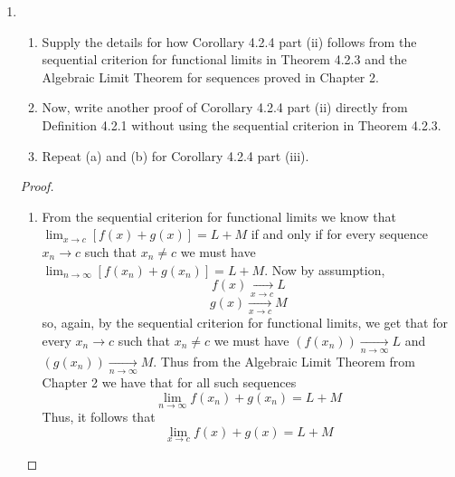 \begin{enumerate}
\begin{proof}
\begin{enumerate}
        So, we wish to show that \( \forall \epsilon > 0 \), \( \exists \delta > 0 \) such that \( x \neq 1 \) and \( x \in V_{\delta}(1) \) implies that
        \( t(x) \in V_{\epsilon}(0) \). If \( \epsilon \geq 1 \) then we are done since \(\forall_{x} t(x) \leq 1 \). Otherwise we have that \( 1 \in S \) and, by our previous argument, it follows that \( 1 \) is a isolated point of \( S \). Thus there exists \( \delta > 0 \) such that \( V_{\delta}(1) \cap S = \{ 1 \} \). Thus, for the same \( \delta \) we have that \( x \neq 1 \) and \( x \in V_{\delta}(1) \) implies that \( x \not\in S \) which, in turn, implies that \( t(x) < \epsilon \) which is equivalent to \( t(x) \in V_{\epsilon}(0) \). Thus, by Definition 4.2.1B, we get that \( \lim_{x \rightarrow 1} t(x) = 0 \). 
    \end{enumerate}
    \end{proof}
    
    \item \begin{enumerate}
        \item Supply the details for how Corollary 4.2.4 part (ii) follows from the sequential criterion for functional limits in Theorem 4.2.3 and the Algebraic Limit Theorem for sequences proved in Chapter 2.
        
        \item Now, write another proof of Corollary 4.2.4 part (ii) directly from Definition 4.2.1 without using the sequential criterion in Theorem 4.2.3.
        
        \item Repeat (a) and (b) for Corollary 4.2.4 part (iii).
    \end{enumerate}
    \begin{proof}
    \begin{enumerate}
    \item From the sequential criterion for functional limits we know that \( \lim_{x \rightarrow c} [f(x) + g(x)] = L+M \) if and only if for every sequence \( x_{n} \rightarrow c \) such that \( x_{n} \neq c \) we must have \( \lim_{n\rightarrow \infty} [f(x_{n})+g(x_{n})]=L+M \). Now by assumption,
    \[
    f(x) \underset{x \rightarrow c}{\rightarrow} L
    \]
    \[
    g(x) \underset{x \rightarrow c}{\rightarrow} M
    \]
    so, again, by the sequential criterion for functional limits, we get that for every \( x_{n} \rightarrow c \) such that \( x_{n} \neq c \) we must have \( \left( f(x_{n}) \right) \underset{n \rightarrow \infty}{\rightarrow} L \) and \( \left( g(x_{n}) \right) \underset{n \rightarrow \infty}{\rightarrow} M \). Thus from the Algebraic Limit Theorem from Chapter 2 we have that for all such sequences
    \[
    \lim_{n \rightarrow \infty} f(x_{n})+g(x_{n}) = L+M
    \]
    Thus, it follows that
    \[
    \lim_{x \rightarrow c} f(x) + g(x) = L+M 
    \]
    

\end{enumerate}
\end{proof}
\end{enumerate}
